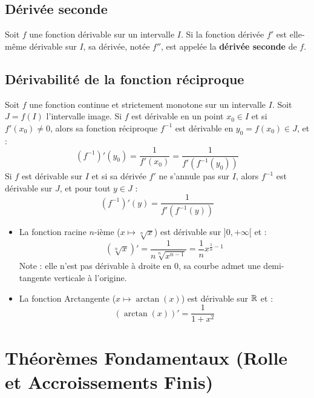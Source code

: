 \subsection{Dérivée seconde}

\begin{definition}
Soit $f$ une fonction dérivable sur un intervalle $I$. Si la fonction dérivée $f'$ est elle-même dérivable sur $I$, sa dérivée, notée $f''$, est appelée la \textbf{dérivée seconde} de $f$.
\end{definition}

\subsection{Dérivabilité de la fonction réciproque}

\begin{theoreme}[Dérivabilité de $f^{-1}$]
Soit $f$ une fonction continue et strictement monotone sur un intervalle $I$. Soit $J = f(I)$ l'intervalle image.
Si $f$ est dérivable en un point $x_0 \in I$ et si $f'(x_0) \ne 0$, alors sa fonction réciproque $f^{-1}$ est dérivable en $y_0 = f(x_0) \in J$, et :
\[
(f^{-1})'(y_0) = \frac{1}{f'(x_0)} = \frac{1}{f'(f^{-1}(y_0))}
\]
Si $f$ est dérivable sur $I$ et si sa dérivée $f'$ ne s'annule pas sur $I$, alors $f^{-1}$ est dérivable sur $J$, et pour tout $y \in J$ :
\[
(f^{-1})'(y) = \frac{1}{f'(f^{-1}(y))}
\]
\end{theoreme}

\begin{propriete}
\begin{itemize}
    \item La fonction racine $n$-ième ($x \mapsto \sqrt[n]{x}$) est dérivable sur $]0, +\infty[$ et :
    \[
    (\sqrt[n]{x})' = \frac{1}{n\sqrt[n]{x^{n-1}}} = \frac{1}{n} x^{\frac{1}{n}-1}
    \]
    Note : elle n'est pas dérivable à droite en 0, sa courbe admet une demi-tangente verticale à l'origine.
    \item La fonction Arctangente ($x \mapsto \arctan(x)$) est dérivable sur $\mathbb{R}$ et :
    \[
    (\arctan(x))' = \frac{1}{1+x^2}
    \]
\end{itemize}
\end{propriete}

\section{Théorèmes Fondamentaux (Rolle et Accroissements Finis)}

